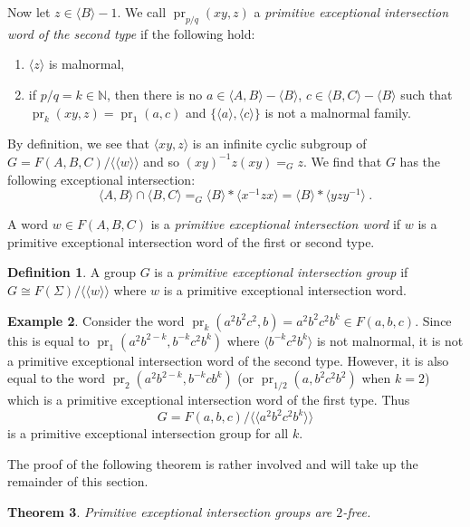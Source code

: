 \documentclass[11pt, a4paper]{amsart}
\newtheorem{theorem}{Theorem}[section]
\theoremstyle{definition}
\newtheorem{definition}[theorem]{Definition}
\newtheorem{example}[theorem]{Example}
\newcommand{\isom}{\cong}
\newcommand{\N}{\mathbb{N}}
\newcommand{\normal}[1]{\langle\langle #1 \rangle\rangle}
\DeclareMathOperator{\pr}{pr}
\begin{document}
Now let $z\in \langle B\rangle - 1$. We call $\pr_{p/q}(xy, z)$ a \emph{primitive exceptional intersection word of the second type} if the following hold:
\begin{enumerate}
\item $\langle z\rangle$ is malnormal,
\item if $p/q = k\in \N$, then there is no $a\in \langle A, B\rangle - \langle B\rangle$, $c\in \langle B, C\rangle - \langle B\rangle$ such that $\pr_{k}(xy, z) = \pr_{1}(a, c)$ and $\{\langle a\rangle, \langle c\rangle\}$ is not a malnormal family.
\end{enumerate}
By definition, we see that $\langle xy, z\rangle$ is an infinite cyclic subgroup of $G = F(A, B, C)/\normal{w}$ and so $(xy)^{-1}z(xy) =_G z$. We find that $G$ has the following exceptional intersection:
\[
\langle A, B\rangle \cap \langle B, C\rangle =_G \langle B\rangle *\langle x^{-1}zx\rangle = \langle B\rangle*\langle yzy^{-1}\rangle~.
\]

A word $w\in F(A, B, C)$ is a \emph{primitive exceptional intersection word} if $w$ is a primitive exceptional intersection word of the first or second type.

\begin{definition}
\label{pie_group}
A group $G$ is a \emph{primitive exceptional intersection group} if $G\isom F(\Sigma)/\normal{w}$ where $w$ is a primitive exceptional intersection word.
\end{definition}

\begin{example}
\label{not_second_type}
Consider the word $\pr_{k}(a^2b^2c^2, b) = a^2b^2c^2b^k\in F(a, b, c)$. Since this is equal to $\pr_{1}(a^2b^{2-k}, b^{-k}c^2b^k)$ where $\langle b^{-k}c^2b^k\rangle$ is not malnormal, it is not a primitive exceptional intersection word of the second type. However, it is also equal to the word $\pr_{2}(a^2b^{2-k}, b^{-k}cb^k)$ (or $\pr_{1/2}(a, b^2c^2b^2)$ when $k = 2$) which is a primitive exceptional intersection word of the first type. Thus
\[
G = F(a, b, c)/\normal{a^2b^2c^2b^k}
\]
is a primitive exceptional intersection group for all $k$.
\end{example}



The proof of the following theorem is rather involved and will take up the remainder of this section.

\begin{theorem}
\label{primitive_negative_immersions}
Primitive exceptional intersection groups are $2$-free.
\end{theorem}
\end{document}
